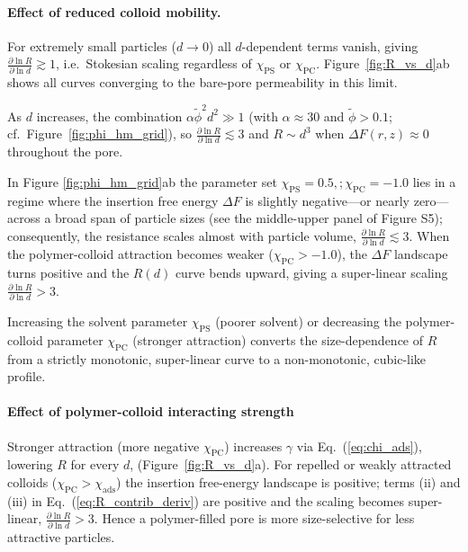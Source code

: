\documentclass[12pt, a4paper]{article}
\begin{document}
\paragraph{Effect of reduced colloid mobility.}
For extremely small particles ($d\to0$) all $d$-dependent terms vanish, giving $\tfrac{\partial\ln R}{\partial\ln d}\gtrsim1$, i.e.\ Stokesian scaling regardless of $\chi_{\text{PS}}$ or $\chi_{\text{PC}}$.
Figure~\ref{fig:R_vs_d}ab shows all curves converging to the bare-pore permeability in this limit.

As $d$ increases, the combination $\alpha\tilde{\phi}^{2}d^{2}\gg1$ (with $\alpha\!\approx\!30$ and $\tilde{\phi}\!>\!0.1$; cf.\ Figure~\ref{fig:phi_hm_grid}), so $\tfrac{\partial\ln R}{\partial\ln d}\lesssim3$ and $R\sim d^{3}$ when $\Delta F(r,z)\approx0$ throughout the pore.

In Figure \ref{fig:phi_hm_grid}ab the parameter set $\chi_{\text{PS}} = 0.5,;\chi_{\text{PC}} = -1.0$ lies in a regime where the insertion free energy $\Delta F$ is slightly negative—or nearly zero—across a broad span of particle sizes (see the middle-upper panel of Figure S5); consequently, the resistance scales almost with particle volume, $\tfrac{\partial\ln R}{\partial\ln d}\lesssim3$.
When the polymer-colloid attraction becomes weaker ($\chi_{\text{PC}} > -1.0$), the $\Delta F$ landscape turns positive and the $R(d)$ curve bends upward, giving a super-linear scaling $\tfrac{\partial\ln R}{\partial\ln d}>3$.

Increasing the solvent parameter $\chi_{\text{PS}}$ (poorer solvent) or decreasing the polymer-colloid parameter $\chi_{\text{PC}}$ (stronger attraction) converts the size-dependence of $R$ from a strictly monotonic, super-linear curve to a non-monotonic, cubic-like profile.

\paragraph{Effect of polymer-colloid interacting strength}
Stronger attraction (more negative $\chi_{\text{PC}}$) increases $\gamma$ via Eq.~(\ref{eq:chi_ads}), lowering $R$ for every $d$,  (Figure~\ref{fig:R_vs_d}a).
For repelled or weakly attracted colloids ($\chi_{\text{PC}}\!>\!\chi_{\text{ads}}$) the insertion free-energy landscape is positive; terms (ii) and (iii) in Eq.~(\ref{eq:R_contrib_deriv}) are positive and the scaling becomes super-linear, $\tfrac{\partial\ln R}{\partial\ln d}>3$.
Hence a polymer-filled pore is more size-selective for less attractive particles.
\end{document}
